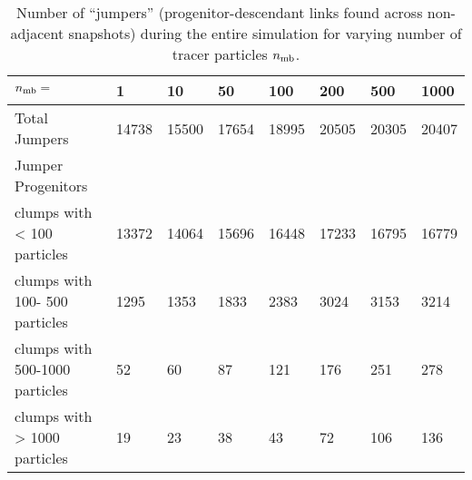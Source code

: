\begin{table*}
  \caption{Number of ``jumpers'' (progenitor-descendant links found
    across non-adjacent snapshots) during the entire simulation for
    varying number of tracer particles $n_{\rm mb}$.  }
  \label{tab:jumpers}
  {\small

\begin{tabular}[c]{l | p{1cm} | p{1cm} | p{1cm} | p{1cm} | p{1cm} | p{1cm} | p{1cm} |}
    $n_{\rm mb}=$                   & 1           & 10          & 50          & 100         & 
    200         & 500         & 1000        \\
\hline
    Total Jumpers                   &    14738    &    15500    &    17654    &    18995    &    
    20505    &    20305    &    20407    \\
\hline
    Jumper Progenitors & & & & & & & \\
    clumps with <  100 particles    &    13372    &    14064    &    15696    &    16448    &    
    17233    &    16795    &    16779    \\
    clumps with  100- 500 particles &     1295    &     1353    &     1833    &     2383    &     
    3024    &     3153    &     3214    \\
    clumps with  500-1000 particles &       52    &       60    &       87    &      121    &      
    176    &      251    &      278    \\
    clumps with > 1000 particles    &       19    &       23    &       38    &       43    &       
    72    &      106    &      136    \\
\hline
\end{tabular}


} %
\end{table*}
